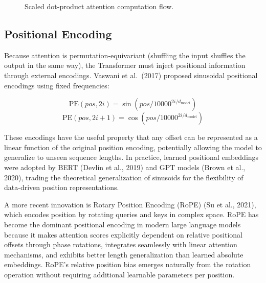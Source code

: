 \documentclass[10pt,twocolumn]{article}
\begin{document}
\begin{figure}[!tbp]
\centering
\resizebox{0.65\textwidth}{!}{}
\caption{Scaled dot-product attention computation flow.}\label{fig:attention}
\end{figure}

\subsection{Positional Encoding}\label{positional-encoding}

Because attention is permutation-equivariant (shuffling the input shuffles the output in the same way), the Transformer must inject positional information through external encodings. Vaswani et al.~(2017) proposed sinusoidal positional encodings using fixed frequencies:

\begin{equation*}\text{PE}(pos, 2i) = \sin\left(pos / 10000^{2i/d_{\text{model}}}\right)\end{equation*}
\begin{equation*}\text{PE}(pos, 2i+1) = \cos\left(pos / 10000^{2i/d_{\text{model}}}\right)\end{equation*}

These encodings have the useful property that any offset can be represented as a linear function of the original position encoding, potentially allowing the model to generalize to unseen sequence lengths. In practice, learned positional embeddings were adopted by BERT (Devlin et al., 2019) and GPT models (Brown et al., 2020), trading the theoretical generalization of sinusoids for the flexibility of data-driven position representations.

A more recent innovation is Rotary Position Encoding (RoPE) (Su et al., 2021), which encodes position by rotating queries and keys in complex space. RoPE has become the dominant positional encoding in modern large language models because it makes attention scores explicitly dependent on relative positional offsets through phase rotations, integrates seamlessly with linear attention mechanisms, and exhibits better length generalization than learned absolute embeddings. RoPE's relative position bias emerges naturally from the rotation operation without requiring additional learnable parameters per position.
\end{document}
